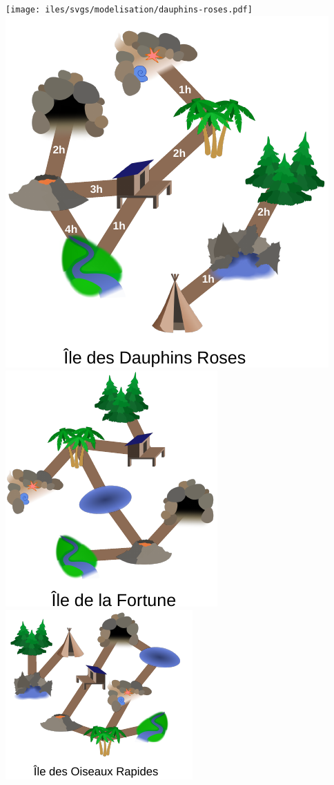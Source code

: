\documentclass[french, landscape]{article}
\begin{document}
\centering
\newpage\texttt{[image: iles/svgs/modelisation/dauphins-roses.pdf]}
\newpage\includegraphics[height=\textheight]{iles/svgs/modelisation/dauphins-roses_temp.pdf}
\newpage\includegraphics[height=\textheight]{iles/svgs/modelisation/ile_fortune.pdf}
\newpage\includegraphics[height=\textheight]{iles/svgs/modelisation/oiseaux-rapides.pdf}
\end{document}
